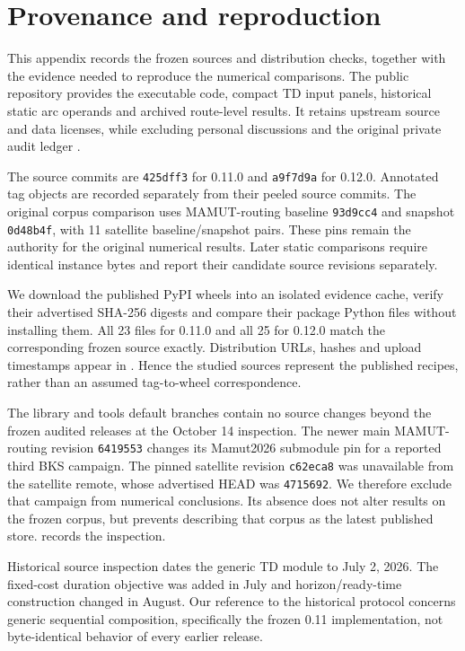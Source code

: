 \section{Provenance and reproduction}\label{app:reproduction}

This appendix records the frozen sources and distribution checks, together with the evidence needed to reproduce the numerical comparisons. The public repository provides the executable code, compact TD input panels, historical static arc operands and archived route-level results. It retains upstream source and data licenses, while excluding personal discussions and the original private audit ledger \autocite{onyrInvestigation2026}.

The source commits are \texttt{425dff3} for 0.11.0 and \texttt{a9f7d9a} for 0.12.0. Annotated tag objects are recorded separately from their peeled source commits. The original corpus comparison uses MAMUT-routing baseline \texttt{93d9cc4} and snapshot \texttt{0d48b4f}, with 11 satellite baseline/snapshot pairs. These pins remain the authority for the original numerical results. Later static comparisons require identical instance bytes and report their candidate source revisions separately.

We download the published PyPI wheels into an isolated evidence cache, verify their advertised SHA-256 digests and compare their package Python files without installing them. All 23 files for 0.11.0 and all 25 for 0.12.0 match the corresponding frozen source exactly. Distribution URLs, hashes and upload timestamps appear in . Hence the studied sources represent the published recipes, rather than an assumed tag-to-wheel correspondence.

The library and tools default branches contain no source changes beyond the frozen audited releases at the October 14 inspection. The newer main MAMUT-routing revision \texttt{6419553} changes its Mamut2026 submodule pin for a reported third BKS campaign. The pinned satellite revision \texttt{c62eca8} was unavailable from the satellite remote, whose advertised HEAD was \texttt{4715692}. We therefore exclude that campaign from numerical conclusions. Its absence does not alter results on the frozen corpus, but prevents describing that corpus as the latest published store.  records the inspection.

Historical source inspection dates the generic TD module to July 2, 2026. The fixed-cost duration objective was added in July and horizon/ready-time construction changed in August. Our reference to the historical protocol concerns generic sequential composition, specifically the frozen 0.11 implementation, not byte-identical behavior of every earlier release.

